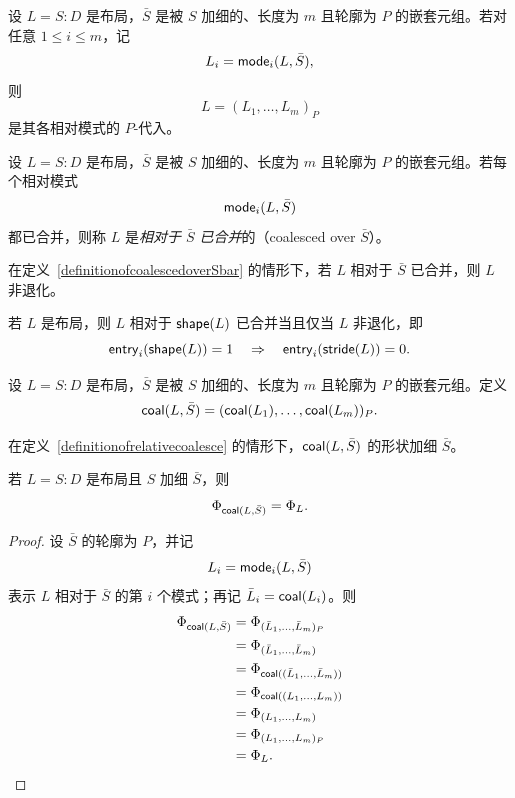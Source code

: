 \begin{observation}
    设 $L = S:D$ 是布局，$\bar{S}$ 是被 $S$ 加细的、长度为 $m$ 且轮廓为 $P$ 的嵌套元组。若对任意 $1 \leq i \leq m$，记
    \[
    L_i = \mathsf{mode}_i(L,\bar{S}),
    \]
    则
    \[
    L =(L_1,\dots,L_m)_P
    \]
    是其各相对模式的 $P$-代入。
\end{observation}

\begin{definition}\label{definitionofcoalescedoverSbar}
    设 $L = S:D$ 是布局，$\bar{S}$ 是被 $S$ 加细的、长度为 $m$ 且轮廓为 $P$ 的嵌套元组。若每个相对模式
    \[
    \mathsf{mode}_i(L,\bar{S})
    \]
    都已合并，则称 $L$ 是{\it 相对于 $\bar{S}$ 已合并}的（coalesced over $\bar{S}$）。
\end{definition}

\begin{observation}\label{coalescedoverSbarimpliesnondegenerate}
    在定义~\ref{definitionofcoalescedoverSbar} 的情形下，若 $L$ 相对于 $\bar{S}$ 已合并，则 $L$ 非退化。
\end{observation}

\begin{example}
    若 $L$ 是布局，则 $L$ 相对于 $\mathsf{shape}(L)$ 已合并当且仅当 $L$ 非退化，即
    \[
    \mathsf{entry}_i(\mathsf{shape}(L)) =1 \quad \Rightarrow \quad \mathsf{entry}_i(\mathsf{stride}(L)) = 0.
    \]
\end{example}

\begin{definition}[相对合并]\label{definitionofrelativecoalesce}
    设 $L = S:D$ 是布局，$ \bar{S}$ 是被 $S$ 加细的、长度为 $m$ 且轮廓为 $P$ 的嵌套元组。定义
    \[
    \mathsf{coal}(L,\bar{S}) = (\mathsf{coal}(L_1),\dots,\mathsf{coal}(L_m))_P.
    \]
\end{definition}

\begin{remark}
     在定义~\ref{definitionofrelativecoalesce} 的情形下，$\mathsf{coal}(L,\bar{S})$ 的形状加细 $\bar{S}$。
\end{remark}

\begin{lemma}\label{relativecoalescepreserveslayoutfunction}
    若 $L = S:D$ 是布局且 $S$ 加细 $\bar{S}$，则
    \[
    \Phi_{\mathsf{coal}(L,\bar{S})} = \Phi_L.
    \]
\end{lemma}

\begin{proof}
    设 $\bar{S}$ 的轮廓为 $P$，并记
    \[
    L_i = \mathsf{mode}_i(L,\bar{S})
    \]
    表示 $L$ 相对于 $\bar{S}$ 的第 $i$ 个模式；再记 $\bar{L}_i = \mathsf{coal}(L_i)$。则
    \begin{align*}
    \Phi_{\mathsf{coal}(L,\bar{S})} & = \Phi_{(\bar{L}_1,\dots,\bar{L}_m)_P}\\
    & = \Phi_{(\bar{L}_1,\dots,\bar{L}_m)}\\
    & = \Phi_{\mathsf{coal}((\bar{L}_1,\dots,\bar{L}_m))}\\
    & = \Phi_{\mathsf{coal}((L_1,\dots,L_m))}\\
    & = \Phi_{(L_1,\dots,L_m)}\\
    & = \Phi_{(L_1,\dots,L_m)_P}\\
    & = \Phi_L.
    \end{align*}
\end{proof}

